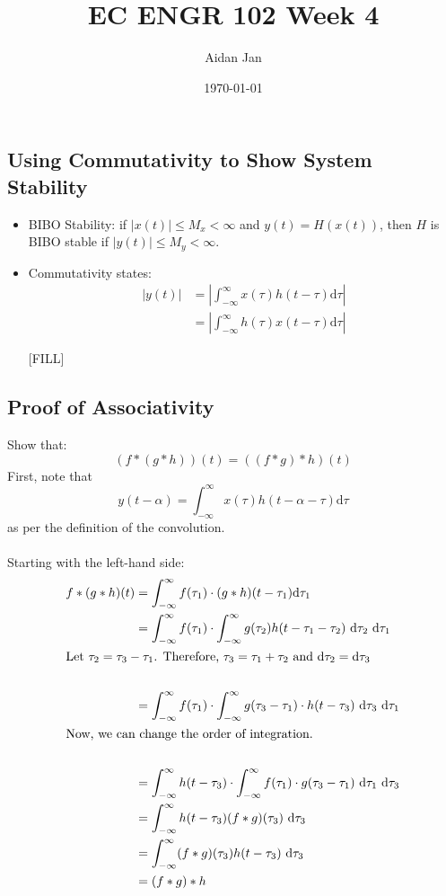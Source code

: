 \documentclass[10pt]{article}
\title{EC ENGR 102 Week 4}
\author{Aidan Jan}
\date{\today}
\begin{document}
\maketitle

\subsection*{Using Commutativity to Show System Stability}
\begin{itemize}
    \item BIBO Stability: if $|x(t)| \leq M_x < \infty$ and $y(t) = H(x(t))$, then $H$ is BIBO stable if $|y(t)| \leq M_y < \infty$.
    \item Commutativity states:
    \begin{align*}
        |y(t)| &= \left|\int_{-\infty}^\infty x(\tau) h(t - \tau) \text{d}\tau\right|\\
        &= \left|\int_{-\infty}^\infty h(\tau) x(t - \tau) \text{d}\tau \right|
    \end{align*}

    [FILL]
\end{itemize}

\subsection*{Proof of Associativity}
Show that:
\[(f * (g * h))(t) = ((f * g) * h)(t)\]
First, note that
\[y(t - \alpha) = \int_{-\infty}^\infty x(\tau) h(t - \alpha - \tau) \text{d}\tau\]
as per the definition of the convolution.\\\\
Starting with the left-hand side:
\begin{align*}
f * (g * h)(t) &= \int_{-\infty}^\infty f(\tau_1) \cdot (g * h)(t - \tau_1) \text{d}\tau_1\\
&= \int_{-\infty}^\infty f(\tau_1) \cdot \int_{-\infty}^\infty g(\tau_2) h(t - \tau_1 - \tau_2) \text{ d}\tau_2 \text{ d}\tau_1\\
\intertext{Let $\tau_2 = \tau_3 - \tau_1$.  Therefore, $\tau_3 = \tau_1 + \tau_2$ and $\text{d}\tau_2 = \text{d}\tau_3$}\\
&= \int_{-\infty}^\infty f(\tau_1) \cdot \int_{-\infty}^\infty g(\tau_3 - \tau_1) \cdot h(t - \tau_3) \text{ d} \tau_3 \text{ d}\tau_1\\
\intertext{Now, we can change the order of integration.}\\
&= \int_{-\infty}^\infty h(t - \tau_3) \cdot \int_{-\infty}^\infty f(\tau_1) \cdot g(\tau_3 - \tau_1) \text{ d} \tau_1 \text{ d} \tau_3\\
&= \int_{-\infty}^\infty h(t - \tau_3) (f * g) (\tau_3) \text{ d}\tau_3\\
&= \int_{-\infty}^\infty (f * g)(\tau_3) h(t - \tau_3) \text{ d}\tau_3\\
&= (f * g) * h
\end{align*}
\end{document}
